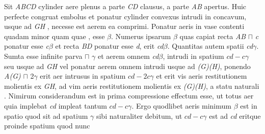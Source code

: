                   \pstart   Sit \textit{ABCD} cylinder  aere plenus a parte \textit{CD} clausus, a parte \textit{AB} apertus. Huic perfecte  congruat embolus\protect{}  et ponatur cylinder convexus intrudi in concavum, usque ad \textit{GH} , necesse est aerem ea  comprimi. Ponatur aeris in vase contenti  quadam minor quam quae , esse $\beta$. Numerus ipsarum  $\beta$ quas capiat recta \textit{AB} $\sqcap$ \textit{c} ponatur esse \textit{c$\beta$} et recta \textit{BD} ponatur esse \textit{d}, erit  \textit{cd$\beta$}. Quantitas autem spatii \textit{cd$\gamma$}. Sumta  esse infinite parva $\sqcap$ $\gamma$ et aerem omnem \textit{cd$\beta$}, intrudi in spatium $cd-c\gamma$ seu usque ad \textit{GH} vel  ponatur aerem omnem intrudi usque ad \textit{(G)(H)}, ponendo \textit{A(G)} $\sqcap$ 2$\gamma$ erit aer intrusus in spatium $cd-2c\gamma$ et erit vis aeris\protect{} restitutionem molientis ex \textit{GH}, ad vim aeris\protect{} restitutionem molientis ex \textit{(G)(H)},   a statu naturali\protect{} . Nimirum considerandum est in prima compressione\protect{} effectum esse, ut totus aer quia implebat \textit{cd} impleat tantum $cd-c\gamma$. Ergo quodlibet aeris minimum $\beta$ est in spatio quod sit ad spatium $\gamma$ sibi naturaliter debitum, ut $cd-c\gamma$ est ad \textit{cd} eritque proinde spatium quod nunc 